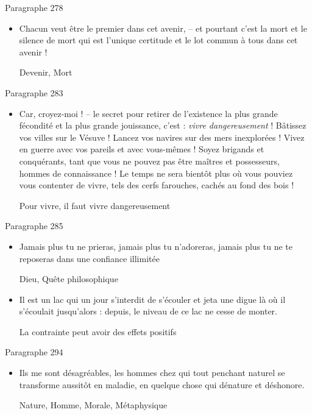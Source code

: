 \documentclass[french,a4paper,11pt,answers]{exam}
\newcommand{\cit}[2]{\og #1 \fg{} \begin{solution}{ #2 }\end{solution}} %
\begin{document}
	\begin{cadre}{Paragraphe 278}
		\begin{itemize}
			\item \cit{Chacun veut être le premier dans cet avenir, -- et pourtant c'est la mort et le silence de mort qui est l'unique certitude et le lot commun à tous dans cet avenir !}
				{Devenir, Mort}
		\end{itemize}
	\end{cadre}
	
	\begin{cadre}{Paragraphe 283}
		\begin{itemize}
			\item \cit{Car, croyez-moi ! -- le secret pour retirer de l'existence la plus grande fécondité et la plus grande jouissance, c'est : \emph{vivre dangereusement} ! Bâtissez vos villes sur le Vésuve ! Lancez vos navires sur des mers inexplorées ! Vivez en guerre avec vos pareils et avec vous-mêmes ! Soyez brigands et conquérants, tant que vous ne pouvez pas être maîtres et possesseurs, hommes de connaissance ! Le temps ne sera bientôt plus où vous pouviez vous contenter de vivre, tels des cerfs farouches, cachés au fond des bois !}
				{Pour vivre, il faut vivre dangereusement}
		\end{itemize}
	\end{cadre}
	
	\begin{cadre}{Paragraphe 285}
		\begin{itemize}
			\item \cit{Jamais plus tu ne prieras, jamais plus tu n'adoreras, jamais plus tu ne te reposeras dans une confiance illimitée}
				{Dieu, Quête philosophique}
			\item \cit{Il est un lac qui un jour s'interdit de s'écouler et jeta une digue là où il s'écoulait jusqu'alors : depuis, le niveau de ce lac ne cesse de monter.}
				{La contrainte peut avoir des effets positifs}
		\end{itemize}
	\end{cadre}
	
	\begin{cadre}{Paragraphe 294}
		\begin{itemize}
			\item \cit{Ils me sont désagréables, les hommes chez qui tout penchant naturel se transforme aussitôt en maladie, en quelque chose qui dénature et déshonore.}
				{Nature, Homme, Morale, Métaphysique}
		\end{itemize}
	\end{cadre}
\end{document}
